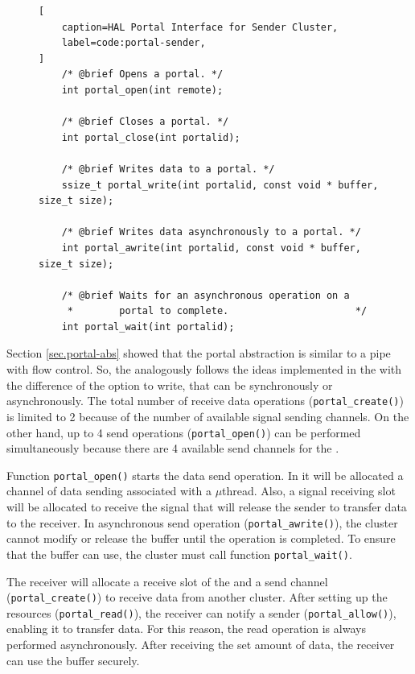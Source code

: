 \begin{figure}[t]
\begin{lstlisting}[
	caption=HAL Portal Interface for Sender Cluster,
	label=code:portal-sender,
]
	/* @brief Opens a portal. */
	int portal_open(int remote);

	/* @brief Closes a portal. */
	int portal_close(int portalid);

	/* @brief Writes data to a portal. */
	ssize_t portal_write(int portalid, const void * buffer, size_t size);

	/* @brief Writes data asynchronously to a portal. */
	int portal_awrite(int portalid, const void * buffer, size_t size);

	/* @brief Waits for an asynchronous operation on a
	 *        portal to complete.                      */
	int portal_wait(int portalid);
\end{lstlisting}
\end{figure}

		Section \ref{sec.portal-abs} showed that the portal abstraction is similar to
		a \posix pipe with flow control.
		So, the \portal analogously follows the ideas implemented
		in the \mailbox with the difference of the option to write,
		that can be synchronously or asynchronously.
		The total number of receive data operations (\texttt{portal\_create()})
		is limited to 2 because of the number of available signal sending channels.
		On the other hand, up to 4 send operations (\texttt{portal\_open()})
		can be performed simultaneously because there are 4 available send
		channels for the \portal.

		Function \texttt{portal\_open()} starts the data send operation.
		In it will be allocated a channel of data sending associated with
		a $\mu$thread.
		Also, a signal receiving slot will be allocated to receive the
		signal that will release the sender to transfer data to the receiver.
		In asynchronous send operation (\texttt{portal\_awrite()}), the cluster
		cannot modify or release the buffer until the operation is completed.
		To ensure that the buffer can use, the cluster must call function \texttt{portal\_wait()}.

		The receiver will allocate a receive slot of the \dnoc and a send
		channel (\texttt{portal\_create()}) to receive data from another cluster.
		After setting up the resources (\texttt{portal\_read()}), the receiver
		can notify a sender (\texttt{portal\_allow()}), enabling it to transfer data.
		For this reason, the read operation is always performed asynchronously.
		After receiving the set amount of data, the receiver can use the buffer securely.

